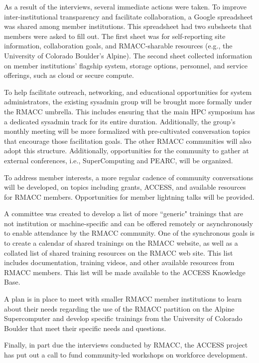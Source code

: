 \documentclass[sigconf]{acmart}
\theoremstyle{plain}
\begin{document}
As a result of the interviews, several immediate actions were taken. To
improve inter-institutional transparency and facilitate collaboration, a
Google spreadsheet was shared among member institutions. This
spreadsheet had two subsheets that members were asked to fill out. The
first sheet was for self-reporting site information, collaboration
goals, and RMACC-sharable resources (e.g., the University of Colorado
Boulder's Alpine). The second sheet collected information on member
institutions' flagship system, storage options, personnel, and service
offerings, such as cloud or secure compute. 

To help facilitate outreach, networking, and educational opportunities
for system administrators, the existing sysadmin group will be brought
more formally under the RMACC umbrella. This includes ensuring that the
main HPC symposium has a dedicated sysadmin track for its entire
duration.  Additionally, the group's monthly meeting will be more
formalized with pre-cultivated conversation topics that encourage those
facilitation goals.  The other RMACC communities will also adopt this
structure. Additionally, opportunities for the community to gather at
external conferences, i.e., SuperComputing and PEARC, will be organized.

To address member interests, a more regular cadence of community
conversations will be developed, on topics including grants, ACCESS, and
available resources for RMACC members. Opportunities for member
lightning talks will be provided.

A committee was created to develop a list of more ``generic" trainings
that are not institution or machine-specific and can be offered remotely
or asynchronously to enable attendance by the RMACC community. One of
the synchronous goals is to create a calendar of shared trainings on the
RMACC website, as well as a collated list of shared training resources
on the RMACC web site. This list includes documentation, training
videos, and other available resources from RMACC members. This list will
be made available to the ACCESS Knowledge Base.

A plan is in place to meet with smaller RMACC member institutions to
learn about their needs regarding the use of the RMACC partition on the
Alpine Supercomputer and develop specific trainings from the University
of Colorado Boulder that meet their specific needs and questions. 

Finally, in part due the interviews conducted by RMACC, the ACCESS
project has put out a call to fund community-led workshops on workforce
development.
\end{document}
